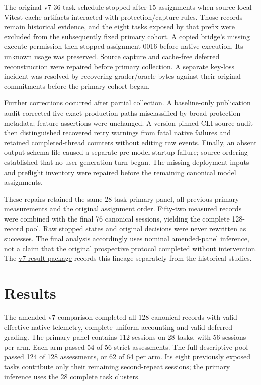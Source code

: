 \documentclass[manuscript,screen,nonacm]{acmart}
\begin{document}
The original v7 36-task schedule stopped after 15 assignments when
source-local Vitest cache artifacts interacted with protection/capture
rules. Those records remain historical evidence, and the eight tasks
exposed by that prefix were excluded from the subsequently fixed primary
cohort. A copied bridge's missing execute permission then stopped
assignment 0016 before native execution. Its unknown usage was
preserved. Source capture and cache-free deferred reconstruction were
repaired before primary collection. A separate key-loss incident was
resolved by recovering grader/oracle bytes against their original
commitments before the primary cohort began.

Further corrections occurred after partial collection. A baseline-only
publication audit corrected five exact production paths misclassified by
broad protection metadata; feature assertions were unchanged. A
version-pinned CLI source audit then distinguished recovered retry
warnings from fatal native failures and retained completed-thread
counters without editing raw events. Finally, an absent output-schema
file caused a separate pre-model startup failure; source ordering
established that no user generation turn began. The missing deployment
inputs and preflight inventory were repaired before the remaining
canonical model assignments.

These repairs retained the same 28-task primary panel, all previous
primary measurements and the original assignment order. Fifty-two
measured records were combined with the final 76 canonical sessions,
yielding the complete 128-record pool. Raw stopped states and original
decisions were never rewritten as successes. The final analysis
accordingly uses nominal amended-panel inference, not a claim that the
original prospective protocol completed without intervention. The
\href{https://github.com/iamsreecharan/Memglide/blob/main/research/results/router-v7-20261021/README.md}{v7
result package} records this lineage separately from the historical
studies.

\section{Results}\label{results}

The amended v7 comparison completed all 128 canonical records with valid
effective native telemetry, complete uniform accounting and valid
deferred grading. The primary panel contains 112 sessions on 28 tasks,
with 56 sessions per arm. Each arm passed 54 of 56 strict assessments.
The full descriptive pool passed 124 of 128 assessments, or 62 of 64 per
arm. Its eight previously exposed tasks contribute only their remaining
second-repeat sessions; the primary inference uses the 28 complete task
clusters.
\end{document}
